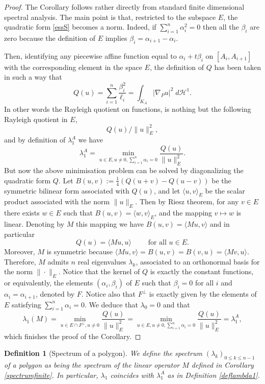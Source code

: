 \documentclass[12pt,english]{smfart} %
\newtheorem{definition}[theorem]{Definition}
\theoremstyle{remark}
\begin{document}
\begin{proof} The Corollary follows rather directly from standard finite dimensional spectral analysis. The main point is that, restricted to the subspace $E$, the quadratic form \eqref{essS} becomes a norm. Indeed, if $\sum_{i=1}^n \alpha_i^2=0$ then all the $\beta_i$ are zero because the definition of $E$ implies $\beta_i=\alpha_{i+1}-\alpha_i$.
 
 
  Then,  identifying any piecewise affine function equal to $\alpha_i+t \beta_i$ on $[A_i,A_{i+1}]$ with the corresponding element in the space $E$, the definition of  $Q$ has been taken in such a way that 
$$Q(u)= \sum_{i=1}^n \frac{\beta_i^2 }{\ell_i} = \int_{K_A} |\nabla_P u|^2 \;d  \mathcal{H}^1.$$
In other words the Rayleigh quotient on functions, is nothing but the following Rayleigh quotient in $E$,
$$ Q(u)/\|u\|_E^2,$$
and by definition of $\lambda_1^A$ we have
$$\lambda_1^A=\min_{u \in E, u\not = 0, \sum_{i=1}^n\alpha_i=0} \frac{Q(u)}{\|u\|_E^2}.$$
But now the above minimisation problem can be solved by    diagonalizing  the quadratic form $Q$. Let $B(u,v):=\frac{1}{4}(Q(u+v)-Q(u-v))$ be the symmetric bilinear form associated with $Q(u)$, and let $\langle  u,v\rangle_E$ be the scalar product associated with the norm $\|u\|_E$. Then by Riesz theorem, for any $v\in E$ there exists $w \in E$ such that $B(u,v)=\langle w, v\rangle_E$, and the mapping $v\mapsto w$ is linear. Denoting by $M$ this mapping we have $B(u,v)=\langle M u,v \rangle$ and in particular
$$Q(u)=\langle M u,u \rangle \quad \quad \text{ for all } u \in E.$$
Moreover,  $M$ is symmetric because $\langle M u,v \rangle=B(u,v)=B(v,u)=\langle M v,u \rangle$. Therefore, $M$ admits $n$ real eigenvalues $\lambda_k$, associated to  an orthonormal basis for the norm $\|\cdot\|_E$. Notice that the kernel of  $Q$ is exactly the constant functions, or equivalently, the elements $(\alpha_i,\beta_i)$ of $E$ such that $\beta_i=0$ for all $i$ and $\alpha_i=\alpha_{i+1}$, denoted by $F$. Notice also that $F^\bot$ is exactly given by the elements of $E$ satisfying $\sum_{i=1}^n\alpha_i=0$. We deduce that $\lambda_0=0$ and that 
$$\lambda_1(M)=\min_{u \in E\cap F^\bot, u\not = 0} \frac{Q(u)}{\|u\|_E^2}=\min_{u \in E, u\not = 0, \sum_{i=1}^n\alpha_i=0} \frac{Q(u)}{\|u\|_E^2}=\lambda_1^A,$$
which finishes the proof of the Corollary. 
\end{proof}
  
  \medskip\begin{definition}[Spectrum of a polygon] We define the spectrum $(\lambda_k)_{0\leqslant k\leqslant n-1}$ of a polygon  as being the spectrum of the linear operator $M$ defined in Corollary \ref{spectrumfinite}. In particular, $\lambda_1$ coincides with   $\lambda_1^A$ as in Definition \ref{deflambda1}. 
    \end{definition} 
  
\end{document}
